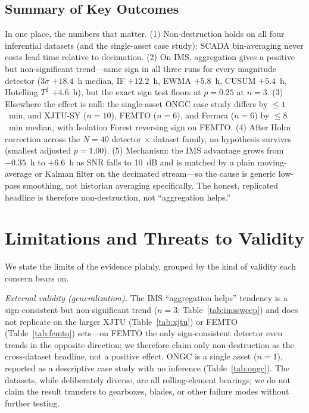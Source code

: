 \documentclass[IJPHM, 2026, 0]{PHMSociety}
\begin{document}
\subsection{Summary of Key Outcomes}
In one place, the numbers that matter. (1) Non-destruction holds on all four inferential datasets (and the single-asset case study): SCADA bin-averaging never costs lead time relative to decimation. (2) On IMS, aggregation gives a positive but non-significant trend---same sign in all three runs for every magnitude detector ($3\sigma$ $+18.4$~h median, IF $+12.2$~h, EWMA $+5.8$~h, CUSUM $+5.4$~h, Hotelling $T^2$ $+4.6$~h), but the exact sign test floors at $p=0.25$ at $n=3$. (3) Elsewhere the effect is null: the single-asset ONGC case study differs by $\le 1$~min, and XJTU-SY ($n=10$), FEMTO ($n=6$), and Ferrara ($n=6$) by $\le 8$~min median, with Isolation Forest reversing sign on FEMTO. (4) After Holm correction across the $N=40$ detector $\times$ dataset family, no hypothesis survives (smallest adjusted $p=1.00$). (5) Mechanism: the IMS advantage grows from $-0.35$~h to $+6.6$~h as SNR falls to 10~dB and is matched by a plain moving-average or Kalman filter on the decimated stream---so the cause is generic low-pass smoothing, not historian averaging specifically. The honest, replicated headline is therefore non-destruction, not ``aggregation helps.''


\section{Limitations and Threats to Validity}
\label{sec:limitations}
We state the limits of the evidence plainly, grouped by the kind of validity each concern bears on.

\emph{External validity (generalization).} The IMS ``aggregation helps'' tendency is a sign-consistent but non-significant trend ($n=3$; Table~\ref{tab:imssweep}) and does not replicate on the larger XJTU (Table~\ref{tab:xjtu}) or FEMTO (Table~\ref{tab:femto}) sets---on FEMTO the only sign-consistent detector even trends in the opposite direction; we therefore claim only non-destruction as the cross-dataset headline, not a positive effect. ONGC is a single asset ($n=1$), reported as a descriptive case study with no inference (Table~\ref{tab:ongc}). The datasets, while deliberately diverse, are all rolling-element bearings; we do not claim the result transfers to gearboxes, blades, or other failure modes without further testing.
\end{document}
